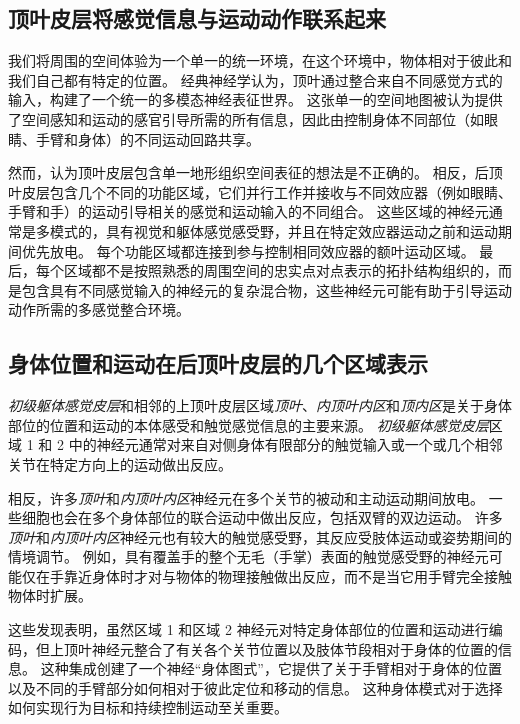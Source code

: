 \subsection{顶叶皮层将感觉信息与运动动作联系起来}

我们将周围的空间体验为一个单一的统一环境，在这个环境中，物体相对于彼此和我们自己都有特定的位置。
经典神经学认为，顶叶通过整合来自不同感觉方式的输入，构建了一个统一的多模态神经表征世界。
这张单一的空间地图被认为提供了空间感知和运动的感官引导所需的所有信息，因此由控制身体不同部位（如眼睛、手臂和身体）的不同运动回路共享。


然而，认为顶叶皮层包含单一地形组织空间表征的想法是不正确的。
相反，后顶叶皮层包含几个不同的功能区域，它们并行工作并接收与不同效应器（例如眼睛、手臂和手）的运动引导相关的感觉和运动输入的不同组合。
这些区域的神经元通常是多模式的，具有视觉和躯体感觉感受野，并且在特定效应器运动之前和运动期间优先放电。
每个功能区域都连接到参与控制相同效应器的额叶运动区域。
最后，每个区域都不是按照熟悉的周围空间的忠实点对点表示的拓扑结构组织的，而是包含具有不同感觉输入的神经元的复杂混合物，这些神经元可能有助于引导运动动作所需的多感觉整合环境。



\subsection{身体位置和运动在后顶叶皮层的几个区域表示}

\textit{初级躯体感觉皮层}和相邻的上顶叶皮层区域\textit{顶叶}、\textit{内顶叶内区}和\textit{顶内区}是关于身体部位的位置和运动的本体感受和触觉感觉信息的主要来源。
\textit{初级躯体感觉皮层}区域 1 和 2 中的神经元通常对来自对侧身体有限部分的触觉输入或一个或几个相邻关节在特定方向上的运动做出反应。


相反，许多\textit{顶叶}和\textit{内顶叶内区}神经元在多个关节的被动和主动运动期间放电。
一些细胞也会在多个身体部位的联合运动中做出反应，包括双臂的双边运动。
许多\textit{顶叶}和\textit{内顶叶内区}神经元也有较大的触觉感受野，其反应受肢体运动或姿势期间的情境调节。
例如，具有覆盖手的整个无毛（手掌）表面的触觉感受野的神经元可能仅在手靠近身体时才对与物体的物理接触做出反应，而不是当它用手臂完全接触物体时扩展。


这些发现表明，虽然区域 1 和区域 2 神经元对特定身体部位的位置和运动进行编码，但上顶叶神经元整合了有关各个关节位置以及肢体节段相对于身体的位置的信息。
这种集成创建了一个神经“身体图式”，它提供了关于手臂相对于身体的位置以及不同的手臂部分如何相对于彼此定位和移动的信息。
这种身体模式对于选择如何实现行为目标和持续控制运动至关重要。


